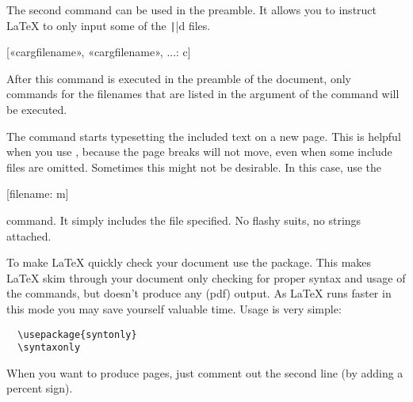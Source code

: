 The second command can be used in the preamble. It allows you to
instruct \LaTeX{} to only input some of the \texttt||d %
files.
\begin{lscommand}
  [{{«\bs carg{filename}», «\bs carg{filename}», ...}}: c]
\end{lscommand}
After this command is executed in the preamble of the document, only
 commands for the filenames that are listed in the
argument of the  command will be executed.

The  command starts typesetting the included text on a new
page. This is helpful when you use , because the
page breaks will not move, even when some include files are omitted.
Sometimes this might not be desirable. In this case, use the
\begin{lscommand}
  [filename: m]
\end{lscommand}
command. It simply includes the file specified.
No flashy suits, no strings attached.

To make \LaTeX{} quickly check your document use the 
package. This makes \LaTeX{} skim through your document only checking for
proper syntax and usage of the commands, but doesn't produce any (pdf) output.
As \LaTeX{} runs faster in this mode you may save yourself valuable time.
Usage is very simple:

\begin{verbatim}
  \usepackage{syntonly}
  \syntaxonly
\end{verbatim}
When you want to produce pages, just comment out the second line
(by adding a percent sign).
